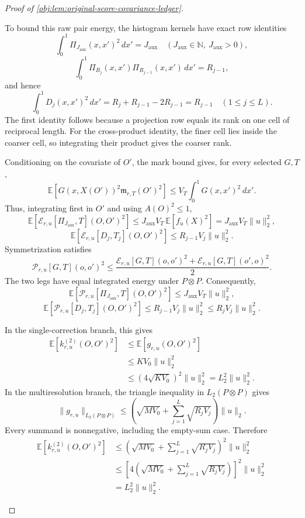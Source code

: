 \documentclass[11pt]{article}
\begin{document}
\begin{proof}[Proof of \cref{obj:lem:original-score-covariance-ledger}]
\begin{enumerate}
To bound this raw pair energy, the histogram kernels have exact row identities
\[
\int_0^1\Pi_{J_{\mathrm{aux}}}(x,x')^2\,dx'
=
J_{\mathrm{aux}}
\quad(J_{\mathrm{aux}}\in\mathbb N,\ J_{\mathrm{aux}}>0),
\]
\[
\int_0^1
\Pi_{R_j}(x,x')\Pi_{R_{j-1}}(x,x')\,dx'
=
R_{j-1},
\]
and hence
\[
\int_0^1D_j(x,x')^2\,dx'
=
R_j+R_{j-1}-2R_{j-1}
=
R_{j-1}
\quad(1\le j\le L).
\]
The first identity follows because a projection row equals its rank on one cell of reciprocal length. For the cross-product identity, the finer cell lies inside the coarser cell, so integrating their product gives the coarser rank.

Conditioning on the covariate of \(O'\), the mark bound gives, for every selected \(G,T\),
\[
\mathbb E[G(x,X(O'))^2\mathfrak m_{r,T}(O')^2]
\le
V_T\int_0^1G(x,x')^2\,dx'.
\]
Thus, integrating first in \(O'\) and using \(A(O)^2\le1\),
\[
\mathbb E[\mathscr E_{r,u}[\Pi_{J_{\mathrm{aux}}},T](O,O')^2]
\le
J_{\mathrm{aux}}V_T\,\mathbb E[f_u(X)^2]
=
J_{\mathrm{aux}}V_T\|u\|_2^2,
\]
\[
\mathbb E[\mathscr E_{r,u}[D_j,T_j](O,O')^2]
\le
R_{j-1}V_j\|u\|_2^2.
\]
Symmetrization satisfies
\[
\mathscr P_{r,u}[G,T](o,o')^2
\le
\frac{
\mathscr E_{r,u}[G,T](o,o')^2
+
\mathscr E_{r,u}[G,T](o',o)^2
}{2}.
\]
The two legs have equal integrated energy under \(P\otimes P\). Consequently,
\[
\mathbb E[\mathscr P_{r,u}[\Pi_{J_{\mathrm{aux}}},T](O,O')^2]
\le
J_{\mathrm{aux}}V_T\|u\|_2^2,
\]
\[
\mathbb E[\mathscr P_{r,u}[D_j,T_j](O,O')^2]
\le
R_{j-1}V_j\|u\|_2^2
\le
R_jV_j\|u\|_2^2.
\]

In the single-correction branch, this gives
\[
\begin{aligned}
\mathbb E[k_{r,u}^{(2)}(O,O')^2]
&\le
\mathbb E[g_{r,u}(O,O')^2]\\
&\le
KV_0\|u\|_2^2\\
&\le
(4\sqrt{KV_0})^2\|u\|_2^2
=
L_2^2\|u\|_2^2.
\end{aligned}
\]
In the multiresolution branch, the triangle inequality in \(L_2(P\otimes P)\) gives
\[
\|g_{r,u}\|_{L_2(P\otimes P)}
\le
\left(
\sqrt{MV_0}
+
\sum_{j=1}^{L}\sqrt{R_jV_j}
\right)\|u\|_2.
\]
Every summand is nonnegative, including the empty-sum case. Therefore
\[
\begin{aligned}
\mathbb E[k_{r,u}^{(2)}(O,O')^2]
&\le
\left(
\sqrt{MV_0}+\sum_{j=1}^{L}\sqrt{R_jV_j}
\right)^2\|u\|_2^2\\
&\le
\left[
4\left(
\sqrt{MV_0}+\sum_{j=1}^{L}\sqrt{R_jV_j}
\right)
\right]^2\|u\|_2^2\\
&=
L_2^2\|u\|_2^2.
\end{aligned}
\]


\end{enumerate}
\end{proof}
\end{document}
